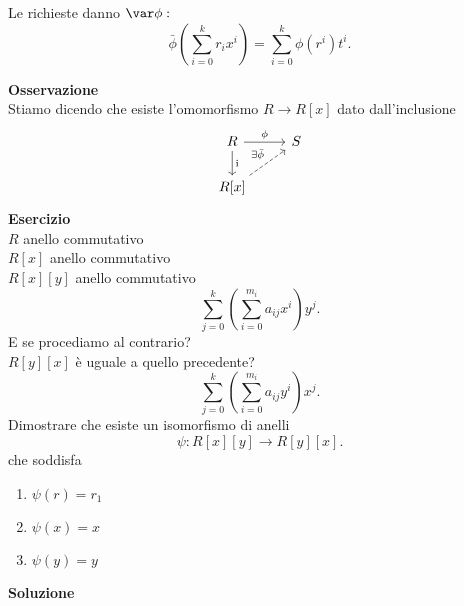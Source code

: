\documentclass{article}
\begin{document}
\begin{dimo}
	Le richieste danno $\var\phi:$
	 \[
		 \bar\phi \left( \sum^{k}_{i=0}r_ix^i \right) = \sum^{k}_{i=0}\phi(r^i)t^i
	.\] 
\end{dimo}
\textbf{Osservazione}\\
Stiamo dicendo che esiste l'omomorfismo $R \rightarrow R[x]$ dato dall'inclusione
\[
\begin{tikzcd}
R \arrow[r, "\phi"] \arrow[d, " \text{i} "] & S \\
R[x] \arrow[ru, "\exists \bar{\phi}", dashed]
\end{tikzcd}
\]
\textbf{Esercizio}\\
$R$ anello commutativo\\
$R[x]$ anello commutativo\\
$R[x][y]$ anello commutativo\\
\[
	\sum^{k}_{j=0} \left( \sum^{m_i}_{i =0}a_{ij}x^i \right)y^j
.\] 
E se procediamo al contrario?\\
$R[y][x]$ è uguale a quello precedente?\\
\[
	\sum^{k}_{j=0} \left( \sum^{m_i}_{i =0}a_{ij}y^i \right)x^j
.\] 
Dimostrare che esiste un isomorfismo di anelli 
\[
	\psi :R[x][y] \rightarrow R[y][x]
.\] 
che soddisfa
\begin{enumerate}
	\item $\psi(r) = r_1$
	\item $\psi(x) = x$
	\item  $\psi(y) = y$
\end{enumerate}
\textbf{Soluzione}\\
\begin{center}
\end{center}
\end{document}
